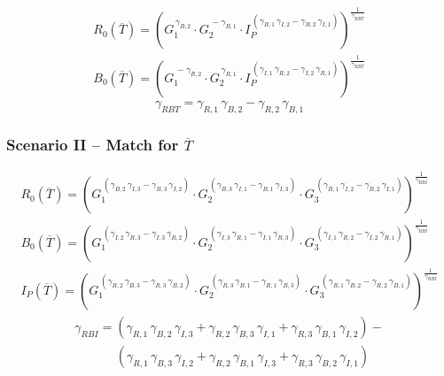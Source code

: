 \begin{gather}
	\label{eq:case_2_R}
	R_0( \overline T) = \left(
	G_1 ^ {  \, \gamma_{B,2} } \cdot
	G_2 ^ {  \, -\gamma_{B,1} } \cdot
	I_P ^ {  \, ( \gamma_{B,1} \, \gamma_{I,2} - \gamma_{B,2} \, \gamma_{I,1} ) }\right)^{ \frac{1}{\gamma_{RBT}} } \\
	\label{eq:case_2_B}
	B_0( \overline T) = \left(
	G_1 ^ {  \, -\gamma_{R,2} } \cdot
	G_2 ^ {  \, \gamma_{R,1} } \cdot
	I_P ^ {  \, ( \gamma_{I,1} \, \gamma_{R,2} - \gamma_{I,2} \, \gamma_{R,1} ) }\right)^{ \frac{1}{\gamma_{RBT}} }
\end{gather}
\begin{equation}
	\label{eq:case_2_gamma}
	\gamma_{RBT} = \gamma_{R,1} \, \gamma_{B,2} - \gamma_{R,2} \, \gamma_{B,1}
\end{equation}

\subsubsection{Scenario II -- Match for $\overline T$}

\begin{gather}
	\label{eq:case_1_R}
	R_0( \overline T) = \left(
	G_1 ^ {  \, ( \gamma_{B,2} \, \gamma_{I,3} - \gamma_{B,3} \, \gamma_{I,2} ) } \cdot
	G_2 ^ {  \, ( \gamma_{B,3} \, \gamma_{I,1} - \gamma_{B,1} \, \gamma_{I,3} ) } \cdot
	G_3 ^ {  \, ( \gamma_{B,1} \, \gamma_{I,2} - \gamma_{B,2} \, \gamma_{I,1} ) }\right)^{ \frac{1}{\gamma_{RBI}} } \\
	\label{eq:case_1_B}
	B_0( \overline T) = \left(
	G_1 ^ {  \, ( \gamma_{I,2} \, \gamma_{R,3} - \gamma_{I,3} \, \gamma_{R,2} ) } \cdot
	G_2 ^ {  \, ( \gamma_{I,3} \, \gamma_{R,1} - \gamma_{I,1} \, \gamma_{R,3} ) } \cdot
	G_3 ^ {  \, ( \gamma_{I,1} \, \gamma_{R,2} - \gamma_{I,2} \, \gamma_{R,1} ) }\right)^{ \frac{1}{\gamma_{RBI}} } \\
	\label{eq:case_1_I}
	I_P( \overline T) = \left(
	G_1 ^ {  \, ( \gamma_{R,2} \, \gamma_{B,3} - \gamma_{R,3} \, \gamma_{B,2} ) } \cdot
	G_2 ^ {  \, ( \gamma_{R,3} \, \gamma_{B,1} - \gamma_{R,1} \, \gamma_{B,3} ) } \cdot
	G_3 ^ {  \, ( \gamma_{R,1} \, \gamma_{B,2} - \gamma_{R,2} \, \gamma_{B,1} ) }\right)^{ \frac{1}{\gamma_{RBI}} }
\end{gather}
\begin{gather}
	\label{eq:case_1_gamma}
	\gamma_{RBI} = ( \gamma_{R,1} \, \gamma_{B,2} \, \gamma_{I,3} +  \gamma_{R,2} \, \gamma_{B,3} \, \gamma_{I,1} + \gamma_{R,3} \, \gamma_{B,1} \, \gamma_{I,2} ) - \\
	\ \ \ \ \ \ \ \ \ \ \ \ \ \ \ ( \gamma_{R,1} \, \gamma_{B,3} \, \gamma_{I,2} +  \gamma_{R,2} \, \gamma_{B,1} \, \gamma_{I,3} + \gamma_{R,3} \, \gamma_{B,2} \, \gamma_{I,1} ) \nonumber
\end{gather}

